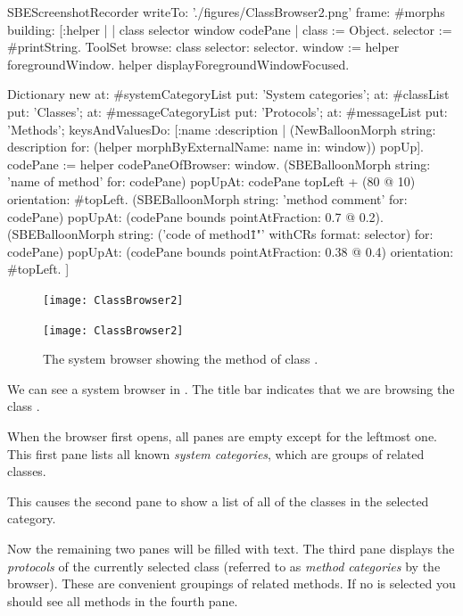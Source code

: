 \documentclass[a4paper,10pt,twoside]{book}
\begin{document}

\begin{ExecuteSmalltalkScript}
SBEScreenshotRecorder writeTo: './figures/ClassBrowser2.png' frame: #morphs building: [:helper |
	| class selector window codePane |
	class := Object. selector := #printString.
	ToolSet browse: class selector: selector.
	window := helper foregroundWindow.
	helper displayForegroundWindowFocused.

	Dictionary new
		at: #systemCategoryList put: 'System categories';
		at: #classList put: 'Classes';
		at: #messageCategoryList put: 'Protocols';
		at: #messageList put: 'Methods';
		keysAndValuesDo: [:name :description |
			(NewBalloonMorph string: description for: (helper morphByExternalName: name in: window))
				popUp].
	codePane := helper codePaneOfBrowser: window.
	(SBEBalloonMorph string: 'name of method' for: codePane)
			popUpAt: codePane topLeft + (80 @ 10)
			orientation: #topLeft.
	(SBEBalloonMorph string: 'method comment' for: codePane)
			popUpAt: (codePane bounds pointAtFraction: 0.7 @ 0.2).
	(SBEBalloonMorph
		string: ('code of method\"{1}"' withCRs format: {selector})
		for: codePane)
			popUpAt: (codePane bounds pointAtFraction: 0.38 @ 0.4)
			orientation: #topLeft.
]
\end{ExecuteSmalltalkScript}
\begin{figure}[htb]
\ifluluelse
	{\centerline {\texttt{[image: ClassBrowser2]}}}
	{\centerline {\texttt{[image: ClassBrowser2]}}}
\caption{The system browser showing the  method of class .
\label{fig:classBrowser}}
\end{figure}

We can see a system browser in .
The title bar indicates that we are browsing the class .

When the browser first opens, all panes are empty except for the leftmost one.
This first pane lists all known \emph{system categories}, which are groups of related classes.

This causes the second pane to show a list of all of the classes in the selected category.

Now the remaining two panes will be filled with text.
The third pane displays the \emph{protocols} of the currently selected class (referred to as \emph{method categories} by the browser).
These are convenient groupings of related methods.
If no  is selected you should see all methods in the fourth pane.
\end{document}
